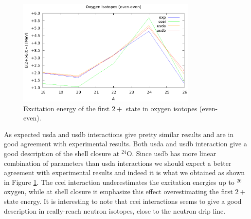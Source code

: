 \documentclass{llncs}
\begin{document}
\begin{figure}[htb!]
\centering
\includegraphics[width=0.8\textwidth]{2+_over_0+.eps}
\caption{Excitation energy of the first $2+$ state in oxygen isotopes (even-even).}
\label{fig:2+/0+}
\end{figure}

As expected usda and usdb interactions give pretty similar results and are in good agreement with experimental results. Both usda and usdb interaction give a good description of the shell closure at $^{24}$O. Since usdb has more linear combination of parameters than usda interactions we should expect a better agreement with experimental results and indeed it is what we obtained as shown in Figure \ref{fig:2+/0+}. The ccei interaction underestimates the excitation energies up to $^{26}$ oxygen, while at shell closure it emphasize this effect overestimating the first $2+$ state energy. It is interesting to note that ccei interactions seems to give a good description in really-reach neutron isotopes, close to the neutron drip line.
\end{document}
